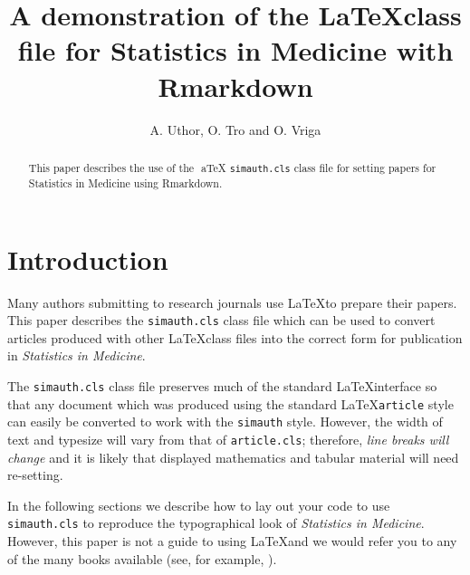 \documentclass[times,]{simauth}
\begin{document}

\title{A demonstration of the \LaTeX class file for Statistics in Medicine with
Rmarkdown}
\author{A. Uthor, O. Tro and O. Vriga}
\address{ Department of Incredible Research, University A\\ Department of Applied Things, University B\\ Very Important Stuff Committee, Institute C\\}

\begin{abstract}
This paper describes the use of the  aTeX \texttt{simauth.cls} class
file for setting papers for Statistics in Medicine using Rmarkdown.
\end{abstract}


\maketitle

\section{Introduction}\label{introduction}

Many authors submitting to research journals use \LaTeX to prepare their
papers. This paper describes the \texttt{simauth.cls} class file which
can be used to convert articles produced with other \LaTeX class files
into the correct form for publication in \emph{Statistics in Medicine}.

The \texttt{simauth.cls} class file preserves much of the standard
\LaTeX interface so that any document which was produced using the
standard \LaTeX \texttt{article} style can easily be converted to work
with the \texttt{simauth} style. However, the width of text and typesize
will vary from that of \texttt{article.cls}; therefore, \emph{line
breaks will change} and it is likely that displayed mathematics and
tabular material will need re-setting.

In the following sections we describe how to lay out your code to use
\texttt{simauth.cls} to reproduce the typographical look of
\emph{Statistics in Medicine}. However, this paper is not a guide to
using \LaTeX and we would refer you to any of the many books available
(see, for example, \citep{R1, R2, R3}).
\end{document}
